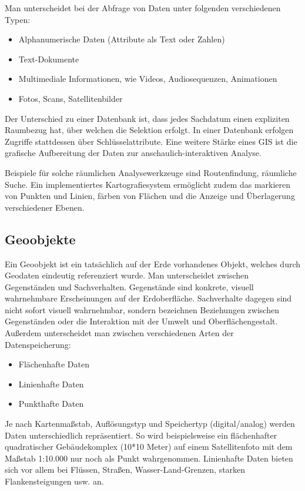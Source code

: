 \documentclass[11pt,fleqn]{book} %
\begin{document}
Man unterscheidet bei der Abfrage von Daten unter folgenden verschiedenen Typen:
\begin{itemize}
\item Alphanumerische Daten (Attribute als Text oder Zahlen)
\item Text-Dokumente 
\item Multimediale Informationen, wie Videos, Audiosequenzen, Animationen 
\item Fotos, Scans, Satellitenbilder
\end{itemize}

Der Unterschied zu einer Datenbank ist, dass jedes Sachdatum einen expliziten Raumbezug hat, über welchen die Selektion erfolgt. In einer Datenbank erfolgen Zugriffe stattdessen über Schlüsselattribute. Eine weitere Stärke eines GIS ist die grafische Aufbereitung der Daten zur anschaulich-interaktiven Analyse.

Beispiele für solche räumlichen Analysewerkzeuge sind Routenfindung, räumliche Suche. Ein implementiertes Kartografiesystem ermöglicht zudem das markieren von Punkten und Linien, färben von Flächen und die Anzeige und Überlagerung verschiedener Ebenen.

\subsection{Geoobjekte}
Ein Geoobjekt ist ein tatsächlich auf der Erde vorhandenes Objekt, welches durch Geodaten eindeutig referenziert wurde. Man unterscheidet zwischen Gegenständen und Sachverhalten. Gegenstände sind konkrete, visuell wahrnehmbare Erscheinungen auf der Erdoberfläche. Sachverhalte dagegen sind nicht sofort visuell wahrnehmbar, sondern bezeichnen Beziehungen zwischen Gegenständen oder die Interaktion mit der Umwelt und Oberflächengestalt.
Außerdem unterscheidet man zwischen verschiedenen Arten der Datenspeicherung:
\begin{itemize}
\item Flächenhafte Daten
\item Linienhafte Daten
\item Punkthafte Daten
\end{itemize}
Je nach Kartenmaßstab, Auflösungstyp und Speichertyp (digital/analog) werden Daten unterschiedlich repräsentiert. So wird beispielsweise ein flächenhafter quadratischer Gebäudekomplex (10*10 Meter) auf einem Satellitenfoto mit dem Maßstab 1:10.000 nur noch als Punkt wahrgenommen. Linienhafte Daten bieten sich vor allem bei Flüssen, Straßen, Wasser-Land-Grenzen, starken Flankensteigungen usw. an.
\end{document}
